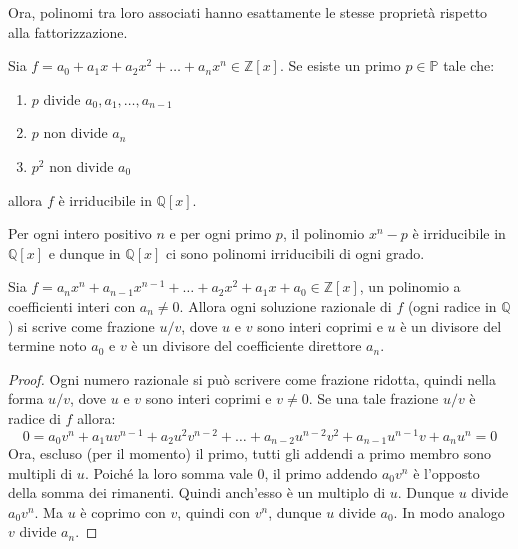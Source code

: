 Ora, polinomi tra loro associati hanno esattamente le stesse proprietà rispetto alla fattorizzazione.

\begin{propbox}
	Sia $f= a_{0}+a_{1}x+a_{2}x^{2}+ \ldots + a_{n}x^{n} \in \mathbb{Z}[x]$. Se esiste un primo $p \in \mathbb{P}$ tale che:
	\begin{enumerate}
		\item $p$ divide $a_{0},a_{1}, \ldots, a_{n-1}$
		\item $p$ non divide $a_{n}$
		\item $p^{2}$ non divide $a_{0}$
	\end{enumerate}
	allora $f$ è irriducibile in $\mathbb{Q}[x]$.
\end{propbox}

\begin{osservation}
	Per ogni intero positivo $n$ e per ogni primo $p$, il polinomio $x^{n} - p$ è irriducibile in $\mathbb{Q}[x]$ e dunque in $\mathbb{Q}[x]$ ci sono polinomi irriducibili di ogni grado.
\end{osservation}


\begin{teorbox}\label{prop:car_radici_Q}
	Sia $f=a_{n}x^{n}+a_{n-1}x^{n-1}+\ldots+a_{2}x^{2}+ a_{1}x +a_{0} \in \mathbb{Z}[x]$, un polinomio a coefficienti interi con $a_{n} \neq 0$. Allora ogni soluzione razionale di $f$ (ogni radice in $\mathbb{Q}$) si scrive come frazione $u/v$, dove $u$ e $v$ sono interi coprimi e $u$ è un divisore del termine noto $a_{0}$ e $v$ è un divisore del coefficiente direttore $a_{n}$.
\end{teorbox}

\begin{proof}
	Ogni numero razionale si può scrivere come frazione ridotta, quindi nella forma $u/v$, dove $u$ e $v$ sono interi coprimi e $v \neq 0$. Se una tale frazione $u/v$ è radice di $f$ allora:
	\begin{displaymath}
		0 = a_{0}v^{n} + a_{1}uv^{n-1} + a_{2}u^{2}v^{n-2}+ \ldots + a_{n-2}u^{n-2}v^{2}+ a_{n-1}u^{n-1}v + a_{n}u^{n}=0
	\end{displaymath}
	Ora, escluso (per il momento) il primo, tutti gli addendi a primo membro sono multipli di $u$. Poiché la loro somma vale 0, il primo addendo $a_{0}v^{n}$ è l'opposto della somma dei rimanenti. Quindi anch'esso è un multiplo di $u$. Dunque $u$ divide $a_{0}v^{n}$. Ma $u$ è coprimo con $v$, quindi con $v^{n}$, dunque $u$ divide $a_{0}$. In modo analogo $v$ divide $a_{n}$.
\end{proof} 

